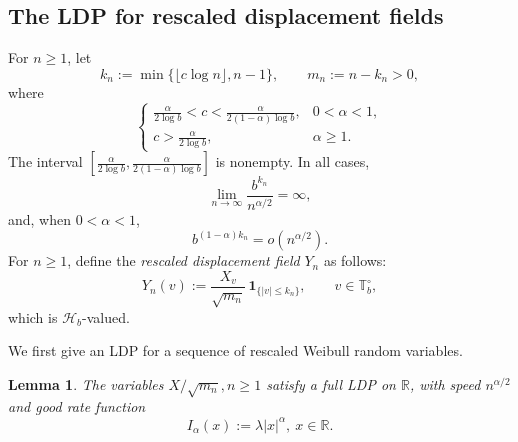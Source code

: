 \documentclass[a4paper, 11pt]{article}
\newcommand{\1}{\mathbf 1}
\theoremstyle{plain}
\newtheorem{lemma}[theorem]{Lemma}
\begin{document}
\subsection{The LDP for rescaled displacement fields}

For $n\geq1$, let
\begin{equation}\label{eq:kn-mn}
  k_n:=\min\{\lfloor c\log n\rfloor, n-1\},
  \qquad
  m_n:=n-k_n>0,
\end{equation}
where
\begin{equation}\label{eq:c-choice}
  \begin{cases}
    \displaystyle
    \frac{\alpha}{2\log b}
    <c<
    \frac{\alpha}{2(1-\alpha)\log b},
      &0<\alpha<1,\\[0.9em]
    \displaystyle
    c>\frac{\alpha}{2\log b},
      &\alpha\geq1.
  \end{cases}
\end{equation}
The interval $[\frac{\alpha}{2\log b},\frac{\alpha}{2(1-\alpha)\log b}]$ is nonempty.  In all cases,
\begin{equation}\label{eq:kn-properties}
  \lim_{n\to\infty}\frac{b^{k_n}}{n^{\alpha/2}}=\infty,
\end{equation}
and, when \(0<\alpha<1\),
\begin{equation}\label{eq:kn-sublinear-property}
  b^{(1-\alpha)k_n}=o(n^{\alpha/2}).
\end{equation}
For $n\geq1$, define the {\em rescaled displacement field} $Y_n$ as follows:
\begin{equation}\label{eq:Yn}
  Y_n(v):=
  \frac{X_v}{\sqrt{m_n}}\,
  \mathbf{1}_{\{|v|\leq k_n\}},
  \qquad v\in\mathbb{T}_b^\circ,
\end{equation}
which is \(\mathcal{H}_b\)-valued.
\par
We first give an LDP for a sequence of rescaled Weibull random variables.
\begin{lemma}\label{lem:one-dimensional-LDP}
The variables \(X/\sqrt{m_n}, n\geq1\) satisfy a full LDP on \(\mathbb{R}\), with speed
\(n^{\alpha/2}\) and good rate function
\[
  I_\alpha(x):=\lambda|x|^\alpha,~x\in\mathbb{ R}.
\]
\end{lemma}
\end{document}
